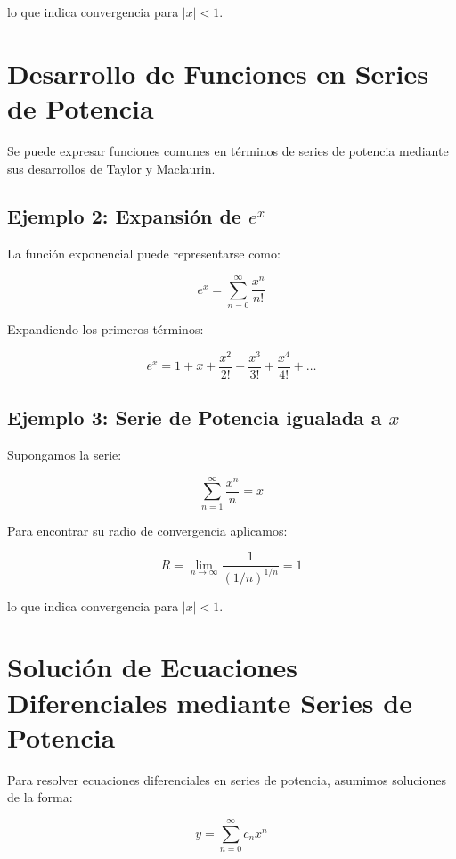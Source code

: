 lo que indica convergencia para \( |x| < 1 \).

\section{Desarrollo de Funciones en Series de Potencia}
Se puede expresar funciones comunes en términos de series de potencia mediante sus desarrollos de Taylor y Maclaurin.

\subsection*{Ejemplo 2: Expansión de \( e^x \)}
La función exponencial puede representarse como:

\begin{equation}
e^x = \sum_{n=0}^{\infty} \frac{x^n}{n!}
\end{equation}

Expandiendo los primeros términos:

\begin{equation}
e^x = 1 + x + \frac{x^2}{2!} + \frac{x^3}{3!} + \frac{x^4}{4!} + \dots
\end{equation}

\subsection*{Ejemplo 3: Serie de Potencia igualada a \( x \)}
Supongamos la serie:

\begin{equation}
\sum_{n=1}^{\infty} \frac{x^n}{n} = x
\end{equation}

Para encontrar su radio de convergencia aplicamos:

\begin{equation}
R = \lim_{n \to \infty} \frac{1}{(1/n)^{1/n}} = 1
\end{equation}

lo que indica convergencia para \( |x| < 1 \).

\section{Solución de Ecuaciones Diferenciales mediante Series de Potencia}
Para resolver ecuaciones diferenciales en series de potencia, asumimos soluciones de la forma:

\begin{equation}
y = \sum_{n=0}^{\infty} c_n x^n
\end{equation}

